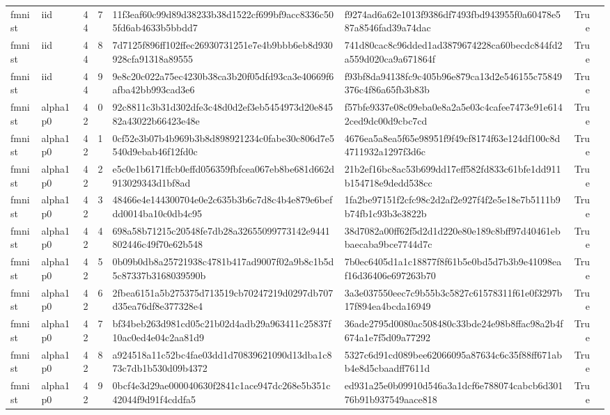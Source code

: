 \begin{tabular}{llrrllrl}
fmnist & iid & 44 & 7 & 11f3eaf60c99d89d38233b38d1522cf699bf9acc8336c505fd6ab4633b5bbdd7 & f9274ad6a62e1013f9386df7493fbd943955f0a60478e587a8546fad39a74dac & True &  \\
fmnist & iid & 44 & 8 & 7d7125f896ff102ffec26930731251e7e4b9bbb6eb8d930928cfa91318a89555 & 741d80cac8c96dded1ad3879674228ca60becdc844fd2a559d020ca9a671864f & True &  \\
fmnist & iid & 44 & 9 & 9e8c20c022a75ec4230b38ca3b20f05dfd93ca3e40669f6afba42bb993cad3e6 & f93bf8da94138fc9c405b96e879ca13d2e546155c75849376c4f86a65fb3b83b & True &  \\
fmnist & alpha1p0 & 42 & 0 & 92c8811c3b31d302dfe3c48d0d2ef3eb5454973d20e84582a43022b66423e48e & f57bfe9337e08c09eba0e8a2a5e03c4cafee7473e91e6142ced9dc00d9cbc7cd & True &  \\
fmnist & alpha1p0 & 42 & 1 & 0cf52e3b07b4b969b3b8d898921234c0fabe30c806d7e5540d9ebab46f12fd0c & 4676ea5a8ea5f65e98951f9f49cf8174f63e124df100c8d4711932a1297f3d6c & True &  \\
fmnist & alpha1p0 & 42 & 2 & e5c0e1b6171ffcb0effd056359fbfcea067eb8be681d662d913029343d1bf8ad & 21b2ef16bc8ac53b699dd17eff582fd833c61bfe1dd911b154718e9dedd538cc & True &  \\
fmnist & alpha1p0 & 42 & 3 & 48466e4e144300704e0e2c635b3b6c7d8c4b4e879e6befdd0014ba10c0db4c95 & 1fa2be97151f2cfc98c2d2af2e927f4f2e5e18e7b5111b9b74fb1c93b3e3822b & True &  \\
fmnist & alpha1p0 & 42 & 4 & 698a58b71215c20548fe7db28a32655099773142e9441802446c49f70e62b548 & 38d7082a00ff62f5d2d1d220e80e189c8bff97d40461ebbaecaba9bce7744d7c & True &  \\
fmnist & alpha1p0 & 42 & 5 & 0b09b0db8a25721938c4781b417ad9007f02a9b8c1b5d5c87337b3168039590b & 7b0ec6405d1a1c18877f8f61b5e0bd5d7b3b9e41098eaf16d36406e697263b70 & True &  \\
fmnist & alpha1p0 & 42 & 6 & 2fbea6151a5b275375d713519cb70247219d0297db707d35ea76df8e377328e4 & 3a3e037550eec7c9b55b3c5827c61578311f61e0f3297b17f894ea4bcda16949 & True &  \\
fmnist & alpha1p0 & 42 & 7 & bf34beb263d981cd05c21b02d4adb29a963411c25837f10ac0ed4e04c2aa81d9 & 36ade2795d0080ac508480c33bde24e98b8ffac98a2b4f674a1e7f5d09a77292 & True &  \\
fmnist & alpha1p0 & 42 & 8 & a924518a11c52bc4fae03dd1d70839621090d13dba1c873c7db1b530d09b4372 & 5327c6d91cd089bee62066095a87634c6c35f88ff671abb4e8d5cbaadff7611d & True &  \\
fmnist & alpha1p0 & 42 & 9 & 0bcf4e3d29ae000040630f2841c1ace947dc268e5b351c42044f9d91f4cddfa5 & ed931a25e0b09910d546a3a1dcf6e788074cabcb6d30176b91b937549aace818 & True &  \\

\end{tabular}

